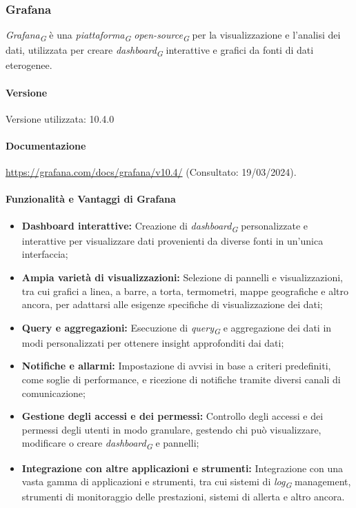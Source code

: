\subsubsection{Grafana}
\textit{Grafana}\textsubscript{\textit{G}} è una \textit{piattaforma}\textsubscript{\textit{G}} \textit{open-source}\textsubscript{\textit{G}} per la visualizzazione e l'analisi dei dati, utilizzata per creare \textit{dashboard}\textsubscript{\textit{G}} interattive e grafici da fonti di dati eterogenee. 

\paragraph{Versione}
Versione utilizzata: 10.4.0

\paragraph{Documentazione}
\url{https://grafana.com/docs/grafana/v10.4/} (Consultato: 19/03/2024).

\paragraph{Funzionalità e Vantaggi di Grafana}
\begin{itemize}
    \item \textbf{Dashboard interattive:} Creazione di \textit{dashboard}\textsubscript{\textit{G}} personalizzate e interattive per visualizzare dati provenienti da diverse fonti in un'unica interfaccia;
        
    \item \textbf{Ampia varietà di visualizzazioni:} Selezione di pannelli e visualizzazioni, tra cui grafici a linea, a barre, a torta, termometri, mappe geografiche e altro ancora, per adattarsi alle esigenze specifiche di visualizzazione dei dati;
    
    \item \textbf{Query e aggregazioni:} Esecuzione di \textit{query}\textsubscript{\textit{G}} e aggregazione dei dati in modi personalizzati per ottenere insight approfonditi dai dati;
    
    \item \textbf{Notifiche e allarmi:} Impostazione di avvisi in base a criteri predefiniti, come soglie di performance, e ricezione di notifiche tramite diversi canali di comunicazione;
    
    \item \textbf{Gestione degli accessi e dei permessi:} Controllo degli accessi e dei permessi degli utenti in modo granulare, gestendo chi può visualizzare, modificare o creare \textit{dashboard}\textsubscript{\textit{G}} e pannelli;
    
    \item \textbf{Integrazione con altre applicazioni e strumenti:} Integrazione con una vasta gamma di applicazioni e strumenti, tra cui sistemi di \textit{log}\textsubscript{\textit{G}} management, strumenti di monitoraggio delle prestazioni, sistemi di allerta e altro ancora.
  \end{itemize}
  
